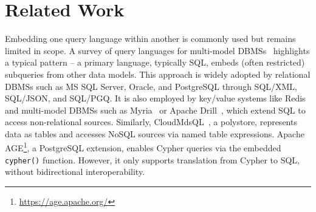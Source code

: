 \section{Related Work}

Embedding one query language within another is commonly used but remains limited in scope. A survey of query languages for multi-model DBMSs~\citep{Jiaheng2023Survey} highlights a typical pattern -- a primary language, typically SQL, embeds (often restricted) subqueries from other data models. This approach is widely adopted by relational DBMSs such as MS SQL Server, Oracle, and PostgreSQL through SQL/XML, SQL/JSON, and SQL/PGQ. It is also employed by key/value systems like Redis and multi-model DBMSs such as Myria~\citep{conf/cidr/WangBBHHHHJMMMM17} or Apache Drill~\citep{Hausenblas2013ApacheDI}, which extend SQL to access non-relational sources.
Similarly, CloudMdsQL~\citep{Kolev2016TheCM}, a polystore, represents data as tables and accesses NoSQL sources via named table expressions.
%
%
%
Apache AGE\footnote{\url{https://age.apache.org/}}, a PostgreSQL extension, enables Cypher queries via the embedded \texttt{cypher()} function. However, it only supports translation from Cypher to SQL, without bidirectional interoperability. %


